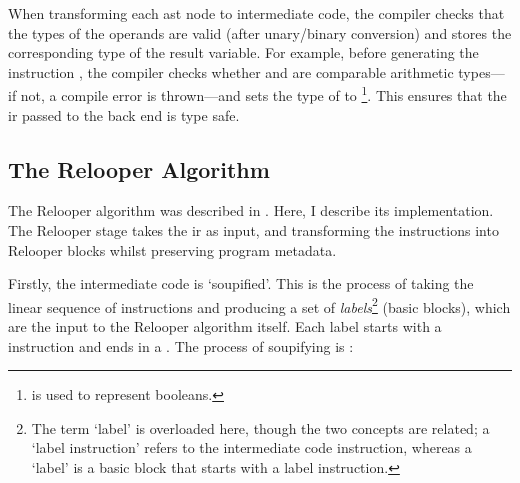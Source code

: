 \documentclass[00-main.tex]{subfiles}
\begin{document}
When transforming each \gls{ast} node to intermediate code, the compiler checks that the types of the operands are valid (after unary/binary conversion) and stores the corresponding type of the result variable.
For example, before generating the instruction , the compiler checks whether  and  are comparable arithmetic types---if not, a compile error is thrown---and sets the type of  to \footnote{ is used to represent booleans.}.
This ensures that the \gls{ir} passed to the back end is type safe.

\subsection{The Relooper Algorithm}\label{sec:impl:relooper algorithm}

The Relooper algorithm was described in .
Here, I describe its implementation.
The Relooper stage takes the \gls{ir} as input, and transforming the instructions into Relooper blocks whilst preserving program metadata.

Firstly, the intermediate code is `soupified'.
This is the process of taking the linear sequence of instructions and producing a set of \emph{labels}\footnote{The term `label' is overloaded here, though the two concepts are related; a `label instruction' refers to the intermediate code instruction, whereas a `label' is a basic block that starts with a label instruction.} (basic blocks), which are the input to the Relooper algorithm itself.
Each label starts with a  instruction and ends in a .
The process of soupifying is :
\end{document}
